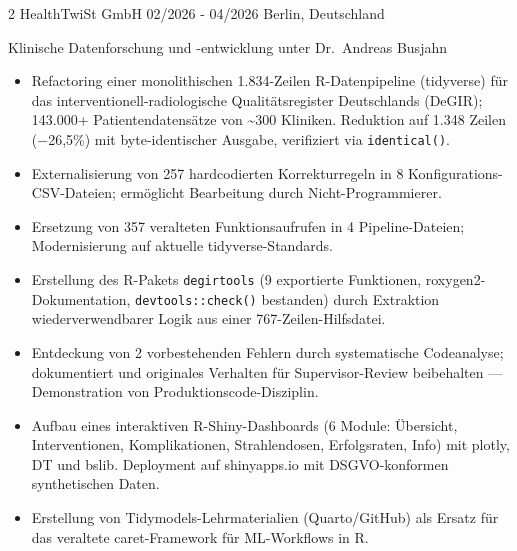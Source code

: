 \documentclass{thejus_cv}
\begin{document}
\begin{paracol}{2}
             {HealthTwiSt GmbH}
             {02/2026 - 04/2026}
             {Berlin, Deutschland}
             {Klinische Datenforschung und -entwicklung unter Dr.~Andreas Busjahn
             \begin{itemize}\setlength{\itemsep}{0.05em}
                   \item Refactoring einer monolithischen 1.834-Zeilen R-Datenpipeline (tidyverse) f\"ur das interventionell-radiologische Qualit\"atsregister Deutschlands (DeGIR); 143.000+ Patientendatens\"atze von \textasciitilde300 Kliniken. Reduktion auf 1.348 Zeilen ($-$26,5\%) mit byte-identischer Ausgabe, verifiziert via \texttt{identical()}.
                   \item Externalisierung von 257 hardcodierten Korrekturregeln in 8 Konfigurations-CSV-Dateien; erm\"oglicht Bearbeitung durch Nicht-Programmierer.
                   \item Ersetzung von 357 veralteten Funktionsaufrufen in 4 Pipeline-Dateien; Modernisierung auf aktuelle tidyverse-Standards.
                   \item Erstellung des R-Pakets \texttt{degirtools} (9 exportierte Funktionen, roxygen2-Dokumentation, \texttt{devtools::check()} bestanden) durch Extraktion wiederverwendbarer Logik aus einer 767-Zeilen-Hilfsdatei.
                   \item Entdeckung von 2 vorbestehenden Fehlern durch systematische Codeanalyse; dokumentiert und originales Verhalten f\"ur Supervisor-Review beibehalten --- Demonstration von Produktionscode-Disziplin.
                   \item Aufbau eines interaktiven R-Shiny-Dashboards (6 Module: \"Ubersicht, Interventionen, Komplikationen, Strahlendosen, Erfolgsraten, Info) mit plotly, DT und bslib. Deployment auf shinyapps.io mit DSGVO-konformen synthetischen Daten.
                   \item Erstellung von Tidymodels-Lehrmaterialien (Quarto/GitHub) als Ersatz f\"ur das veraltete caret-Framework f\"ur ML-Workflows in R.
               \end{itemize}}


\end{paracol}
\end{document}
